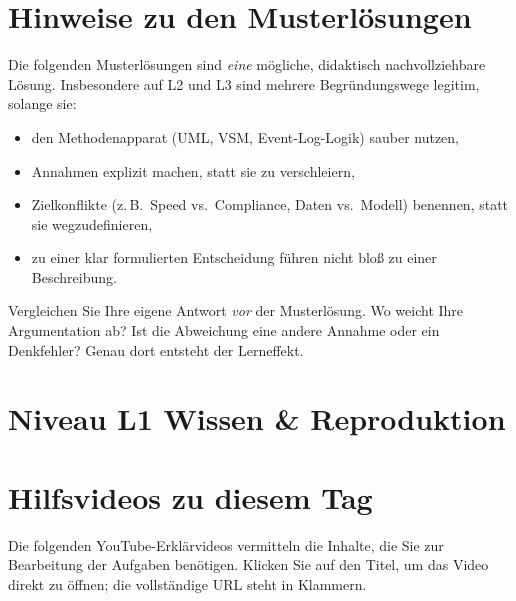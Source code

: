 \documentclass[11pt,a4paper,oneside]{article}
\begin{document}
\section*{Hinweise zu den Musterl\"osungen}
\thispagestyle{plain}

\noindent Die folgenden Musterl\"osungen sind \emph{eine} m\"ogliche, didaktisch nachvollziehbare L\"osung. Insbesondere auf L2 und L3 sind mehrere Begr\"undungswege legitim, solange sie:

\begin{itemize}
  \item den Methodenapparat (UML, VSM, Event-Log-Logik) sauber nutzen,
  \item Annahmen explizit machen, statt sie zu verschleiern,
  \item Zielkonflikte (z.\,B.\ Speed vs.\ Compliance, Daten vs.\ Modell) benennen, statt sie wegzudefinieren,
  \item zu einer klar formulierten Entscheidung f\"uhren \textendash{} nicht blo{\ss} zu einer Beschreibung.
\end{itemize}

\begin{infobox}
Vergleichen Sie Ihre eigene Antwort \emph{vor} der Musterl\"osung. Wo weicht Ihre Argumentation ab? Ist die Abweichung eine andere Annahme \textendash{} oder ein Denkfehler? Genau dort entsteht der Lerneffekt.
\end{infobox}

\clearpage

\section*{Niveau L1 \textendash{} Wissen \& Reproduktion}

\section*{Hilfsvideos zu diesem Tag}
\thispagestyle{plain}

\noindent Die folgenden YouTube-Erkl\"arvideos vermitteln die Inhalte, die Sie zur Bearbeitung der Aufgaben ben\"otigen. Klicken Sie auf den Titel, um das Video direkt zu \"offnen; die vollst\"andige URL steht in Klammern.
\end{document}
